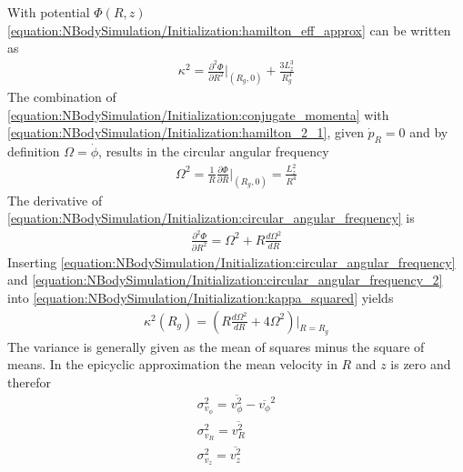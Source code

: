 \documentclass[letterpaper,10pt,english]{sphinxmanual}
\begin{document}
					\sphinxAtStartPar
					With potential \(\Phi\left(R,z\right)\) \eqref{equation:NBodySimulation/Initialization:hamilton_eff_approx} can be written as
					\begin{equation}\label{equation:NBodySimulation/Initialization:kappa_squared}
					\begin{split}\kappa^2 = \frac{\partial^2\Phi}{\partial R^2}\bigg|_{(R_g,0)} + \frac{3L_z^3}{R_g^4}\end{split}
					\end{equation}
					\sphinxAtStartPar
					The combination of \eqref{equation:NBodySimulation/Initialization:conjugate_momenta} with \eqref{equation:NBodySimulation/Initialization:hamilton_2_1}, given \(\dot{p}_{R}=0\) and by definition \(\Omega = \dot{\phi}\), results in the circular angular frequency
					\begin{equation}\label{equation:NBodySimulation/Initialization:circular_angular_frequency}
					\begin{split}\Omega^2 = \frac{1}{R} \frac{\partial \Phi }{\partial R}\bigg|_{(R_g,0)} = \frac{L_z^2}{R^4}\end{split}
					\end{equation}
					\sphinxAtStartPar
					The derivative of \eqref{equation:NBodySimulation/Initialization:circular_angular_frequency} is
					\begin{equation}\label{equation:NBodySimulation/Initialization:circular_angular_frequency_2}
					\begin{split}\frac{\partial^2\Phi}{\partial R^2} = \Omega^2 + R \frac{d\Omega^2}{dR}\end{split}
					\end{equation}
					\sphinxAtStartPar
					Inserting \eqref{equation:NBodySimulation/Initialization:circular_angular_frequency} and \eqref{equation:NBodySimulation/Initialization:circular_angular_frequency_2} into \eqref{equation:NBodySimulation/Initialization:kappa_squared} yields
					\begin{equation}\label{equation:NBodySimulation/Initialization:epicyclic_frequency}
					\begin{split}\kappa^2(R_g) = \left ( R\frac{d\Omega^2}{dR} + 4\Omega^2 \right )\bigg|_{R=R_g}\end{split}
					\end{equation}
					\sphinxAtStartPar
					The variance is generally given as the mean of squares minus the square of means.
					In the epicyclic approximation the mean velocity in \(R\) and \(z\) is zero and therefor
					\begin{equation}\label{equation:NBodySimulation/Initialization:epicyclic_variance}
					\begin{split}\sigma_{v_{\phi}}^2 = \overline{v_\phi^2} - \overline{v_\phi}^2 \\
					\sigma_{v_{R}}^2 = \overline{v_R^2} \\
					\sigma_{v_{z}}^2 = \overline{v_z^2}\end{split}
					\end{equation}
				
\end{document}
